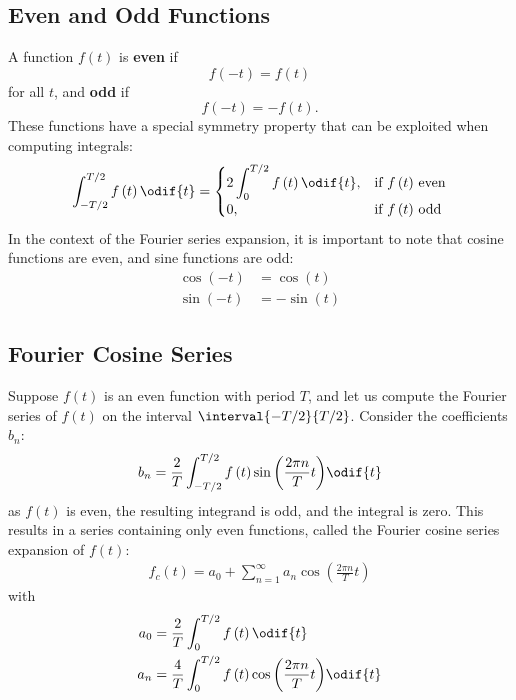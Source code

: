 \documentclass{article}
\begin{document}
\subsection{Even and Odd Functions}
A function \(f\left( t \right)\) is \textbf{even} if
\begin{equation*}
    f\left( -t \right) = f\left( t \right)
\end{equation*}
for all \(t\), and \textbf{odd} if
\begin{equation*}
    f\left( -t \right) = -f\left( t \right).
\end{equation*}
These functions have a special symmetry property that can be exploited
when computing integrals:
\begin{equation*}
    \int_{-T/2}^{T/2} f\left( t \right) \odif{t} =
    \begin{cases}
        2 \displaystyle\int_{0}^{T/2} f\left( t \right) \odif{t}, & \text{if \(f\left( t \right)\) even} \\
        0,                                                        & \text{if \(f\left( t \right)\) odd}
    \end{cases}
\end{equation*}
In the context of the Fourier series expansion, it is important to note
that cosine functions are even, and sine functions are odd:
\begin{align*}
    \cos{\left( -t \right)} & = \cos{\left( t \right)}  \\
    \sin{\left( -t \right)} & = -\sin{\left( t \right)}
\end{align*}
\subsection{Fourier Cosine Series}
Suppose \(f\left( t \right)\) is an even function with period \(T\),
and let us compute the Fourier series of \(f\left( t \right)\) on the
interval \(\interval{-T/2}{T/2}\). Consider the coefficients \(b_n\):
\begin{equation*}
    b_n = \frac{2}{T} \int_{-T/2}^{T/2} f\left( t \right) \sin{\left( \frac{2\pi n}{T} t \right)} \odif{t}
\end{equation*}
as \(f\left( t \right)\) is even, the resulting integrand is odd, and
the integral is zero. This results in a series containing only even
functions, called the Fourier cosine series expansion of
\(f\left( t \right)\):
\begin{align*}
    f_c\left( t \right) = a_0 + \sum_{n=1}^{\infty} a_n \cos{\left( \frac{2\pi n}{T} t \right)}
\end{align*}
with
\begin{align*}
    a_0 & = \frac{2}{T} \int_{0}^{T/2} f\left( t \right) \odif{t}                                         \\
    a_n & = \frac{4}{T} \int_{0}^{T/2} f\left( t \right) \cos{\left( \frac{2\pi n}{T} t \right)} \odif{t}
\end{align*}
\end{document}
